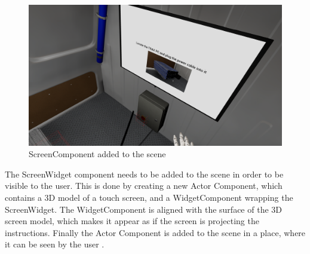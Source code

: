 \documentclass[12pt, a4paper,oneside, nocenter]{thesis}
\begin{document}
\begin{figure}[H]
	\includegraphics[width=\textwidth]{screen-component}
	\caption{ScreenComponent added to the scene}
	\label{fig:screen-component}
\end{figure}
\par
The ScreenWidget component needs to be added to the scene in order to be visible to the user. This is done by creating a new Actor Component, which contains a 3D model of a touch screen, and a WidgetComponent wrapping the ScreenWidget. The WidgetComponent is aligned with the surface of the 3D screen model, which makes it appear as if the screen is projecting the instructions. Finally the Actor Component is added to the scene in a place, where it can be seen by the user .
\end{document}
